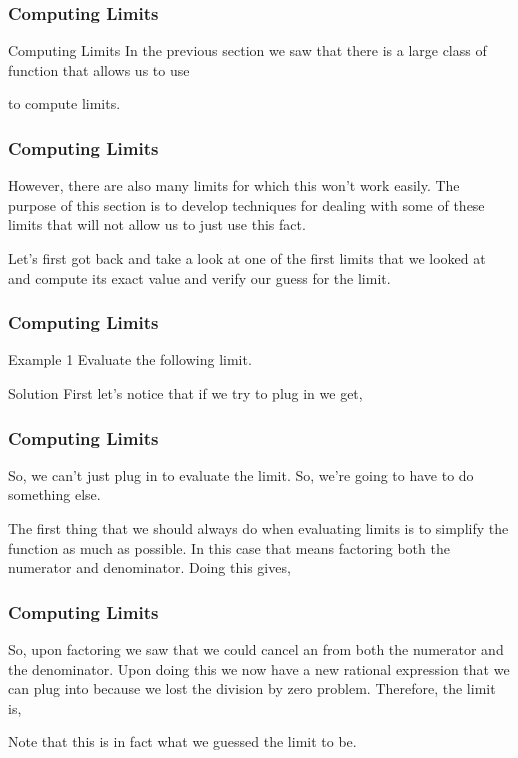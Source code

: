 \documentclass{beamer}
\begin{document}
	
	
\begin{frame}[fragile]
	\frametitle{Computing Limits}
	\Large

Computing Limits
In the previous section we saw that there is a large class of function that allows us to use



to compute limits.  

\end{frame}
\begin{frame}[fragile]
	\frametitle{Computing Limits}
	\Large
	However, there are also many limits for which this won’t work easily.  The purpose of this section is to develop techniques for dealing with some of these limits that will not allow us to just use this fact.

Let’s first got back and take a look at one of the first limits that we looked at and compute its exact value and verify our guess for the limit.
\end{frame}
\begin{frame}[fragile]
\frametitle{Computing Limits}
\Large
Example 1  Evaluate the following limit.

Solution
First let’s notice that if we try to plug in  we get,
\end{frame}
\begin{frame}[fragile]
	\frametitle{Computing Limits}
	\Large

So, we can’t just plug in  to evaluate the limit.  So, we’re going to have to do something else. 

The first thing that we should always do when evaluating limits is to simplify the function as much as possible.  In this case that means factoring both the numerator and denominator.  Doing this gives,

\end{frame}
\begin{frame}[fragile]
	\frametitle{Computing Limits}
	\Large
	
So, upon factoring we saw that we could cancel an  from both the numerator and the denominator.  Upon doing this we now have a new rational expression that we can plug  into because we lost the division by zero problem.  Therefore, the limit is,


Note that this is in fact what we guessed the limit to be.
\end{frame}
\end{document}
